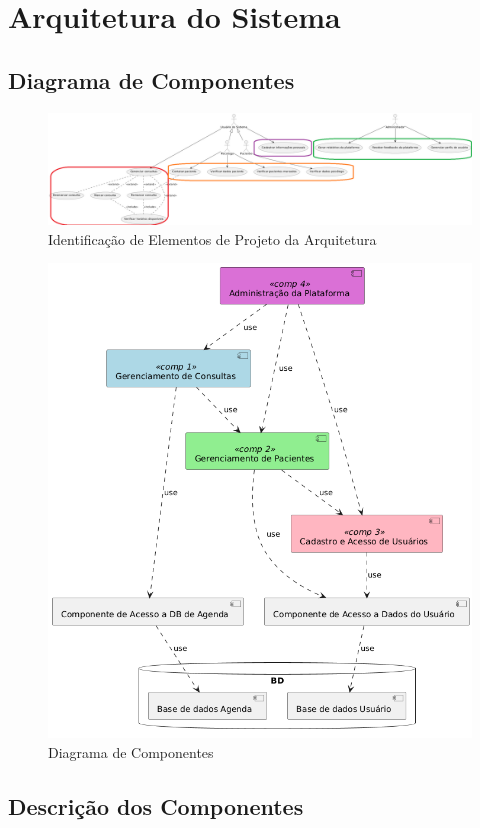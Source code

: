 \documentclass[a4paper,12pt]{report}
\begin{document}
\chapter{Arquitetura do Sistema}

\section{Diagrama de Componentes}
\begin{figure}[h!]
    \centering
    \includegraphics[width=1.0\linewidth]{casosdeuso(agrupado).png}
    \caption{Identificação de Elementos de Projeto da Arquitetura}
    \label{fig:fig1}
\end{figure}

\begin{figure}[h!]
    \centering
    \includegraphics[width=0.5\linewidth]{diagrama_de_classes2.png}
    \caption{Diagrama de Componentes}
    \label{fig:fig2}
\end{figure}

\section{Descrição dos Componentes}
\end{document}
